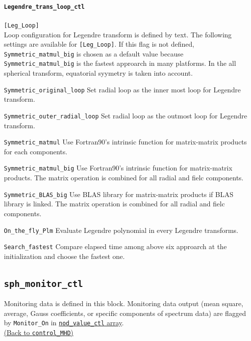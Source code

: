 \paragraph{\tt Legendre\_trans\_loop\_ctl}
\label{href_t:Legendre_trans_loop_ctl}
\verb|[Leg_Loop]| \\
Loop configuration for Legendre transform is defined by text. The following settings are available for \verb|[Leg_Loop]|. 
If this flag is not defined, \verb|Symmetric_matmul_big| is chosen as a default value because \verb|Symmetric_matmul_big| is the fastest approarch in many platforms. In the all spherical transform, equatorial syymetry is taken into account.
%
\begin{description}
\item{\tt Symmetric\_original\_loop}	Set radial loop as the inner most loop for Legendre transform.
\item{\tt Symmetric\_outer\_radial\_loop}	Set radial loop as the outmost loop for Legendre transform.
\item{\tt Symmetric\_matmul}    Use Fortran90's intrinsic function for matrix-matrix products for each components.
\item{\tt Symmetric\_matmul\_big}   Use Fortran90's intrinsic function for matrix-matrix products. The matrix operation is combined for all radial and fielc components.
\item{\tt Symmetric\_BLAS\_big}    Use BLAS library for matrix-matrix products if BLAS library is linked. The matrix operation is combined for all radial and fielc components.
\item{\tt On\_the\_fly\_Plm}   Evaluate Legendre polynomial in every Legendre transforms.
\item{\tt Search\_fastest}	Compare elapsed time among above six approarch at the initialization and choose the fastest one.
\end{description}
%

%
\subsection{\tt sph\_monitor\_ctl}
\label{href_t:sph_monitor_ctl}
Monitoring data is defined in this block. Monitoring data output (mean square, average, Gauss coefficients, or specific components of spectrum data) are flagged by {\tt Monitor\_On} in \hyperref[href_t:nod_value_ctl]{ {\tt nod\_value\_ctl} array}. \\
\hyperref[href_i:sph_monitor_ctl]{(Back to {\tt control\_MHD})}

